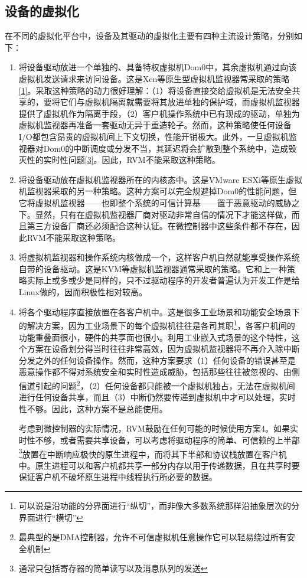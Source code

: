 \subsection{设备的虚拟化}\label{subsec:2-2-5}

在不同的虚拟化平台中，设备及其驱动的虚拟化主要有四种主流设计策略，分别如下：

\begin{enumerate}
\def\labelenumi{{[}\arabic{enumi}{]}}
\item
  将设备驱动放进一个单独的、具备特权虚拟机Dom0中，其余虚拟机通过向该虚拟机发送请求来访问设备。这是Xen等原生型虚拟机监视器常采取的策略\protect\hyperref[cite:2-1]{{[}1{]}}。采取这种策略的动力很好理解：（1）将设备直接交给虚拟机是无法安全共享的，要将它们与虚拟机隔离就需要将其放进单独的保护域，而虚拟机监视器提供了虚拟机作为隔离手段，（2）客户机操作系统中已有现成的驱动，单独为虚拟机监视器再准备一套驱动无异于重造轮子。然而，这种策略使任何设备I/O都包含昂贵的虚拟机间上下文切换，性能开销极大。此外，一旦虚拟机监视器对Dom0的中断调度或分发不当，其延迟将会扩散到整个系统中，造成毁灭性的实时性问题\protect\hyperref[cite:2-3]{{[}3{]}}。因此，RVM不能采取这种策略。
\item
  将设备驱动放在虚拟机监视器所在的内核态中。这是VMware ESXi等原生虚拟机监视器采取的另一种策略。这种方案可以完全规避掉Dom0的性能问题，但它将虚拟机监视器------也即整个系统的可信计算基------置于恶意驱动的威胁之下。显然，只有在虚拟机监视器厂商对驱动非常自信的情况下才能这样做，而且第三方设备厂商还必须配合这种认证。在微控制器中这些条件都不存在，因此RVM不能采取这种策略。
\item
  将虚拟机监视器和操作系统内核做成一个，这样客户机自然就能享受操作系统自带的设备驱动。这是KVM等虚拟机监视器通常采取的策略。它和上一种策略实际上或多或少是同样的，只不过驱动程序的开发者普遍认为开发工作是给Linux做的，因而积极性相对较高。
\item
  将各个驱动程序直接放置在各客户机中。这是很多工业场景和功能安全场景下的解决方案，因为工业场景下的每个虚拟机往往是各司其职\footnote{可以说是沿功能的分界面进行``纵切''，而非像大多数系统那样沿抽象层次的分界面进行``横切''}，各客户机间的功能重叠面很小，硬件的共享面也很小。利用工业嵌入式场景的这个特性，这个方案在设备划分得当时往往非常高效，因为虚拟机监视器将不再介入除中断分发之外的任何设备操作。然而，这种方案要求（1）任何设备的错误甚至是恶意操作都不得对系统安全和实时性造成威胁，包括那些往往被忽视的、由侧信道引起的问题\footnote{最典型的是DMA控制器，允许不可信虚拟机任意操作它可以轻易绕过所有安全机制}，（2）任何设备都只能被一个虚拟机独占，无法在虚拟机间进行任何设备共享，而且（3）中断仍然要传递到虚拟机中才可以处理，实时性不够。因此，这种方案不是总能使用。

  考虑到微控制器的实际情况，RVM鼓励在任何可能的时候使用方案4。如果实时性不够，或者需要共享设备，可以考虑将驱动程序的简单、可信赖的上半部\footnote{通常只包括寄存器的简单读写以及消息队列的发送}放置在中断响应极快的原生进程中，而将其下半部和协议栈放置在客户机中。原生进程可以和客户机都共享一部分内存以用于传递数据，且在共享时要保证客户机不破坏原生进程中线程执行所必要的数据。
\end{enumerate}

